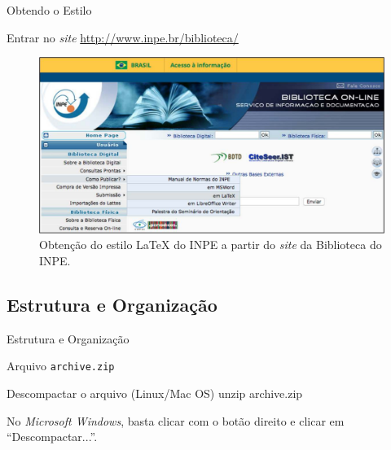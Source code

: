 \documentclass[10pt]{beamer}
\begin{document}
\begin{frame}{Obtendo o Estilo}
\vspace{1em}
\begin{block}{Entrar no \textit{site} \url{http://www.inpe.br/biblioteca/}}
  \begin{figure}[H]
    \begin{center}
        \includegraphics[scale=0.25]{./figs/biblio_pub_latex.pdf}
    \end{center}
    \caption{Obtenção do estilo \LaTeX{} do INPE a partir do \textit{site} da Biblioteca do INPE.}
  \end{figure}
\end{block}
\end{frame}

\subsection{Estrutura e Organização}

\begin{frame}[fragile]{Estrutura e Organização}
    \begin{block}{Arquivo {\tt archive.zip}}
        \vspace{1em}
        \begin{meucomandot}{Descompactar o arquivo (Linux/Mac OS)}
            unzip archive.zip
        \end{meucomandot}
        No \textit{Microsoft Windows}, basta clicar com o botão direito e clicar em ``Descompactar...''.
    \end{block}
\end{frame}
\end{document}
